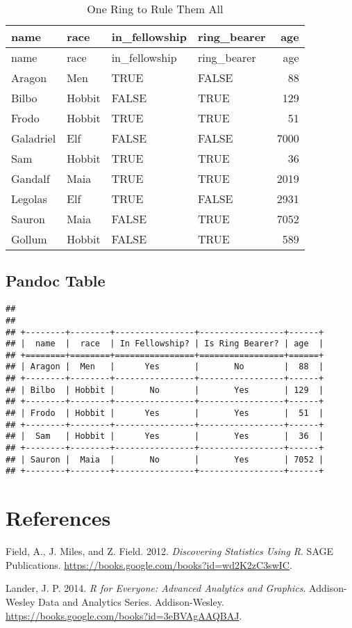 \documentclass[
]{article}
\newlength{\cslhangindent}
\newenvironment{cslreferences}%
  {\setlength{\parindent}{0pt}%
  \everypar{\setlength{\hangindent}{\cslhangindent}}\ignorespaces}%
  {\par}
\begin{document}
\begin{longtable}[]{@{}llllr@{}}
\caption{One Ring to Rule Them All}\tabularnewline
\toprule
name & race & in\_fellowship & ring\_bearer & age\tabularnewline
\midrule
\endfirsthead
\toprule
name & race & in\_fellowship & ring\_bearer & age\tabularnewline
\midrule
\endhead
Aragon & Men & TRUE & FALSE & 88\tabularnewline
Bilbo & Hobbit & FALSE & TRUE & 129\tabularnewline
Frodo & Hobbit & TRUE & TRUE & 51\tabularnewline
Galadriel & Elf & FALSE & FALSE & 7000\tabularnewline
Sam & Hobbit & TRUE & TRUE & 36\tabularnewline
Gandalf & Maia & TRUE & TRUE & 2019\tabularnewline
Legolas & Elf & TRUE & FALSE & 2931\tabularnewline
Sauron & Maia & FALSE & TRUE & 7052\tabularnewline
Gollum & Hobbit & FALSE & TRUE & 589\tabularnewline
\bottomrule
\end{longtable}

\hypertarget{pandoc-table}{%
\subsection{Pandoc Table}\label{pandoc-table}}

\begin{verbatim}
## 
## 
## +--------+--------+----------------+-----------------+------+
## |  name  |  race  | In Fellowship? | Is Ring Bearer? | age  |
## +========+========+================+=================+======+
## | Aragon |  Men   |      Yes       |       No        |  88  |
## +--------+--------+----------------+-----------------+------+
## | Bilbo  | Hobbit |       No       |       Yes       | 129  |
## +--------+--------+----------------+-----------------+------+
## | Frodo  | Hobbit |      Yes       |       Yes       |  51  |
## +--------+--------+----------------+-----------------+------+
## |  Sam   | Hobbit |      Yes       |       Yes       |  36  |
## +--------+--------+----------------+-----------------+------+
## | Sauron |  Maia  |       No       |       Yes       | 7052 |
## +--------+--------+----------------+-----------------+------+
\end{verbatim}

\hypertarget{references}{%
\section*{References}\label{references}}

\hypertarget{refs}{}
\begin{cslreferences}
\leavevmode\hypertarget{ref-field2012discovering}{}%
Field, A., J. Miles, and Z. Field. 2012. \emph{Discovering Statistics
Using R}. SAGE Publications.
\url{https://books.google.com/books?id=wd2K2zC3swIC}.

\leavevmode\hypertarget{ref-lander2014r}{}%
Lander, J. P. 2014. \emph{R for Everyone: Advanced Analytics and
Graphics}. Addison-Wesley Data and Analytics Series. Addison-Wesley.
\url{https://books.google.com/books?id=3eBVAgAAQBAJ}.
\end{cslreferences}
\end{document}

